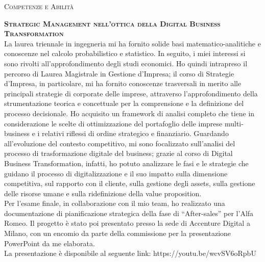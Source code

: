 \documentclass[11pt, a4paper]{article}
\newcommand{\headright}[1]{\vspace*{2.5ex}\textsc{\Large\color{cvblue}#1}\par%
     \vspace*{-2ex}{\color{cvblue}\hrulefill}\par}
\newcommand{\headtitle}[1]{\vspace*{2.5ex}\textsc{\Large\color{white}#1}\par%
     \vspace*{-2ex}{\color{red}\hrulefill}\par}
\begin{document}
\newpage
{}  %
\setlength{\parskip}{0.8ex}



\headright{Competenze e Abilità}

\textbf{\textsc{Strategic Management nell’ottica della Digital Business Transformation}} \\
La laurea triennale in ingegneria mi ha fornito solide basi matematico-analitiche e conoscenze nel calcolo probabilistico e statistico.
In seguito, i miei interessi si sono rivolti all’approfondimento degli studi economici. Ho quindi intrapreso il percorso di Laurea Magistrale in Gestione d’Impresa; il corso di Strategie d’Impresa, in particolare, mi ha fornito conoscenze trasversali in merito alle principali strategie di corporate delle imprese, attraverso l’approfondimento della strumentazione teorica e concettuale per la comprensione e la definizione del processo decisionale.
Ho acquisito un framework di analisi completo che tiene in considerazione le scelte di ottimizzazione del portafoglio delle imprese multi-business e i relativi riflessi di ordine strategico e finanziario.
Guardando all’evoluzione del contesto competitivo, mi sono focalizzato sull’analisi del processo di trasformazione digitale del business; grazie al corso di Digital Business Transformation, infatti, ho potuto analizzare le fasi e le strategie che guidano il processo di digitalizzazione e il suo impatto sulla dimensione competitiva, sul rapporto con il cliente, sulla gestione degli assets, sulla gestione delle risorse umane e sulla ridefinizione della value proposition.
\\
Per l’esame finale, in collaborazione con il mio team, ho realizzato una documentazione di pianificazione strategica della fase di “After-sales” per l’Alfa Romeo. Il progetto è stato poi presentato presso la sede di Accenture Digital a Milano, con un encomio da parte della commissione per la presentazione PowerPoint da me elaborata. 
\\
La presentazione è disponibile al seguente link: https://youtu.be/wcvSV6oRpbU
\end{document}
